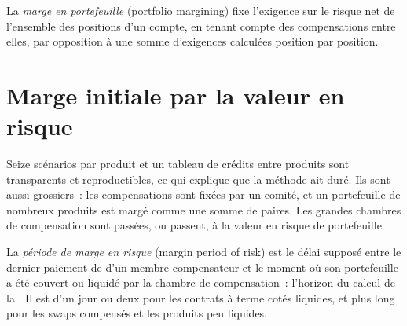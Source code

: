 \begin{definition}\label{def:m1:margin:portfolio}
La \emph{marge en portefeuille} (portfolio margining) fixe l'exigence sur le
risque net de l'ensemble des positions d'un compte, en tenant compte des
compensations entre elles, par opposition à une somme d'exigences calculées
position par position.
\end{definition}

\begin{omfigure}

\label{fig:m1:margin:offsets}
\end{omfigure}

\section{Marge initiale par la valeur en risque}

Seize scénarios par produit et un tableau de crédits entre produits sont
transparents et reproductibles, ce qui explique que la méthode ait duré. Ils sont aussi
grossiers~: les compensations sont fixées par un comité, et un portefeuille de nombreux produits est
margé comme une somme de paires. Les grandes chambres de compensation sont passées, ou
passent, à la valeur en risque de portefeuille.

\begin{definition}\label{def:m1:margin:mpor}
La \emph{période de marge en risque} (margin period of risk) est le délai
supposé entre le dernier paiement de  d'un membre compensateur et le moment
où son portefeuille a été couvert ou liquidé par la chambre de compensation~:
l'horizon du calcul de la . Il est d'un jour ou deux pour les contrats
à terme cotés liquides, et plus long pour les swaps compensés et les produits peu liquides.
\end{definition}

